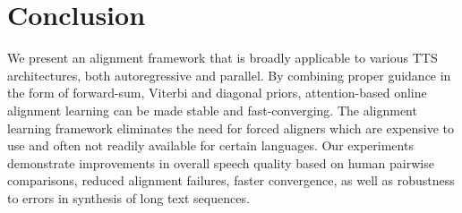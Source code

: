 \section{Conclusion}
We present an alignment framework that is broadly applicable to various TTS architectures, both autoregressive and parallel. 
By combining proper guidance in the form of forward-sum, Viterbi and diagonal priors, attention-based online alignment learning can be made stable and fast-converging. The alignment learning framework eliminates the need for forced aligners which are expensive to use and often not readily available for certain languages. Our experiments demonstrate improvements in overall speech quality based on human pairwise comparisons, reduced alignment failures, faster convergence, as well as robustness to errors in synthesis of long text sequences.

